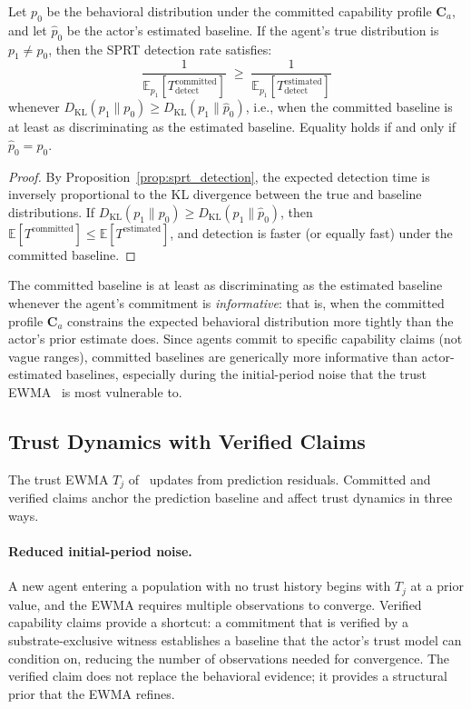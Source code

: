 \begin{proposition}
\label{prop:committed_detection}
Let $p_0$ be the behavioral distribution under the committed capability
profile $\mathbf{C}_a$, and let $\hat{p}_0$ be the actor's estimated
baseline.  If the agent's true distribution is $p_1 \neq p_0$, then
the SPRT detection rate satisfies:
\[
    \frac{1}{\mathbb{E}_{p_1}[T_{\mathrm{detect}}^{\mathrm{committed}}]}
    \;\geq\;
    \frac{1}{\mathbb{E}_{p_1}[T_{\mathrm{detect}}^{\mathrm{estimated}}]}
\]
whenever $D_{\mathrm{KL}}(p_1 \| p_0) \geq D_{\mathrm{KL}}(p_1 \|
\hat{p}_0)$, i.e., when the committed baseline is at least as
discriminating as the estimated baseline.  Equality holds if and only if
$\hat{p}_0 = p_0$.
\end{proposition}

\begin{proof}
By Proposition~\ref{prop:sprt_detection}, the expected detection time
is inversely proportional to the KL divergence between the true and
baseline distributions.  If $D_{\mathrm{KL}}(p_1 \| p_0) \geq
D_{\mathrm{KL}}(p_1 \| \hat{p}_0)$, then $\mathbb{E}[T^{\mathrm{committed}}]
\leq \mathbb{E}[T^{\mathrm{estimated}}]$, and detection is faster
(or equally fast) under the committed baseline.
\end{proof}

The committed baseline is at least as discriminating as the estimated
baseline whenever the agent's commitment is \emph{informative}: that
is, when the committed profile $\mathbf{C}_a$ constrains the expected
behavioral distribution more tightly than the actor's prior estimate
does.  Since agents commit to specific capability claims (not vague
ranges), committed baselines are generically more informative than
actor-estimated baselines, especially during the initial-period
noise that the trust EWMA~\citep{lasser2026gfm} is most vulnerable to.

\subsection{Trust Dynamics with Verified Claims}
\label{sec:trust_dynamics}

The trust EWMA $T_j$ of~\citet{lasser2026gfm} updates from prediction
residuals.  Committed and verified claims anchor
the prediction baseline and affect trust dynamics in three ways.

\paragraph{Reduced initial-period noise.}
A new agent entering a population with no trust history begins with
$T_j$ at a prior value, and the EWMA requires multiple observations to
converge.  Verified capability claims provide a shortcut: a commitment
that is verified by a substrate-exclusive witness establishes a baseline
that the actor's trust model can condition on, reducing the number of
observations needed for convergence.  The verified claim does not
replace the behavioral evidence; it provides a structural prior that
the EWMA refines.

